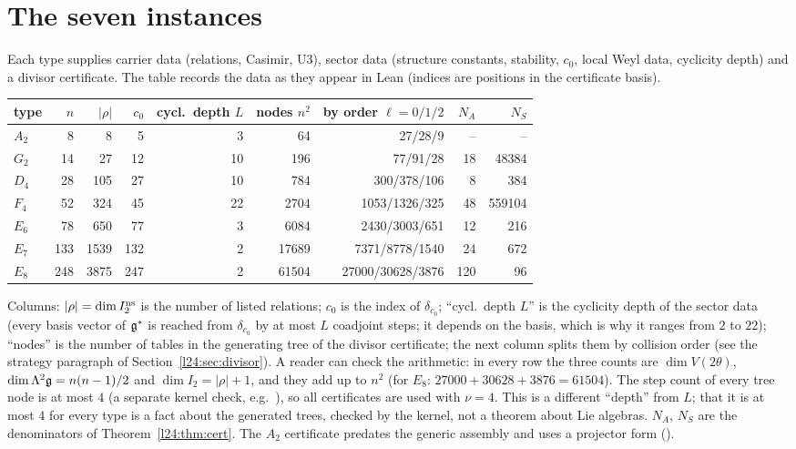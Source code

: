 \section{The seven instances}\label{l24:sec:instances}

Each type supplies carrier data (relations, Casimir, U3), sector data (structure constants, stability, $c_0$, local
Weyl data, cyclicity depth) and a divisor certificate. The table records the data as they appear in Lean (indices
are positions in the certificate basis).

\begin{center}\small
\begin{tabular}{lrrrrrrrr}
\toprule
type & $n$ & $|\rho|$ & $c_0$ & cycl.\ depth $L$ & nodes $n^2$ & by order $\ell=0/1/2$ & $N_A$ & $N_S$\\
\midrule
$A_2$ & 8 & 8 & 5 & 3 & 64 & 27/28/9 & -- & -- \\
$G_2$ & 14 & 27 & 12 & 10 & 196 & 77/91/28 & 18 & 48384\\
$D_4$ & 28 & 105 & 27 & 10 & 784 & 300/378/106 & 8 & 384\\
$F_4$ & 52 & 324 & 45 & 22 & 2704 & 1053/1326/325 & 48 & 559104\\
$E_6$ & 78 & 650 & 77 & 3 & 6084 & 2430/3003/651 & 12 & 216\\
$E_7$ & 133 & 1539 & 132 & 2 & 17689 & 7371/8778/1540 & 24 & 672\\
$E_8$ & 248 & 3875 & 247 & 2 & 61504 & 27000/30628/3876 & 120 & 96\\
\bottomrule
\end{tabular}
\end{center}
Columns: $|\rho|=\dim I_2^{\mathrm{ns}}$ is the number of listed relations; $c_0$ is the index of $\delta_{c_0}$; ``cycl.\ depth $L$'' is
the cyclicity depth of the sector data (every basis vector of $\mathfrak g^*$ is reached from $\delta_{c_0}$ by at most $L$
coadjoint steps; it depends on the basis, which is why it ranges from $2$ to $22$); ``nodes'' is the number of tables in the
generating tree of the divisor certificate; the next column splits them by collision order (see the strategy paragraph of
Section~\ref{l24:sec:divisor}). A reader can check the arithmetic: in every row the three counts are $\dim V(2\theta)$,
$\dim\Lambda^2\mathfrak g=n(n-1)/2$ and $\dim I_2=|\rho|+1$, and they add up to $n^2$ (for $E_8$: $27000+30628+3876=61504$).
The step count of every tree node is at most $4$ (a separate kernel check, e.g.\ ), so all certificates are used
with $\nu=4$. This is a different ``depth'' from $L$; that it is at most $4$ for every type is a fact about the generated
trees, checked by the kernel, not a theorem about Lie algebras. $N_A$, $N_S$ are the denominators of Theorem~\ref{l24:thm:cert}. The $A_2$
certificate predates the generic assembly and uses a projector form ().

